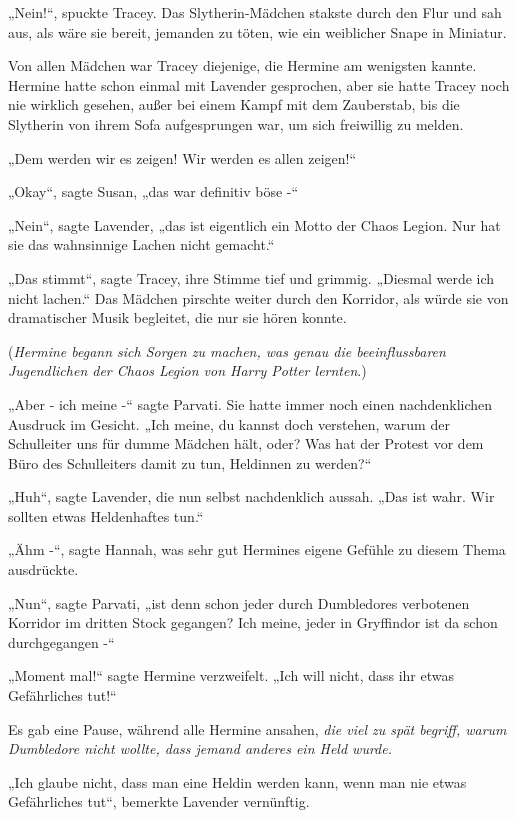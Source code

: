 {„Nein!“, spuckte Tracey. Das Slytherin-Mädchen stakste durch den Flur und sah aus, als wäre sie bereit, jemanden zu töten, wie ein weiblicher Snape in Miniatur.

Von allen Mädchen war Tracey diejenige, die Hermine am wenigsten kannte. Hermine hatte schon einmal mit Lavender gesprochen, aber sie hatte Tracey noch nie wirklich gesehen, außer bei einem Kampf mit dem Zauberstab, bis die Slytherin von ihrem Sofa aufgesprungen war, um sich freiwillig zu melden.

„Dem werden wir es zeigen! Wir werden es allen zeigen!“

„Okay“, sagte Susan, „das war definitiv böse -“

„Nein“, sagte Lavender, „das ist eigentlich ein Motto der Chaos Legion. Nur hat sie das wahnsinnige Lachen nicht gemacht.“

„Das stimmt“, sagte Tracey, ihre Stimme tief und grimmig. „Diesmal werde ich nicht lachen.“ Das Mädchen pirschte weiter durch den Korridor, als würde sie von dramatischer Musik begleitet, die nur sie hören konnte.

(\emph{Hermine begann sich Sorgen zu machen, was genau die beeinflussbaren Jugendlichen der Chaos Legion von Harry Potter lernten}.)

„Aber - ich meine -“ sagte Parvati. Sie hatte immer noch einen nachdenklichen Ausdruck im Gesicht. „Ich meine, du kannst doch verstehen, warum der Schulleiter uns für dumme Mädchen hält, oder? Was hat der Protest vor dem Büro des Schulleiters damit zu tun, Heldinnen zu werden?“

„Huh“, sagte Lavender, die nun selbst nachdenklich aussah. „Das ist wahr. Wir sollten etwas Heldenhaftes tun.“

„Ähm -“, sagte Hannah, was sehr gut Hermines eigene Gefühle zu diesem Thema ausdrückte.

„Nun“, sagte Parvati, „ist denn schon jeder durch Dumbledores verbotenen Korridor im dritten Stock gegangen? Ich meine, jeder in Gryffindor ist da schon durchgegangen -“

„Moment mal!“ sagte Hermine verzweifelt. „Ich will nicht, dass ihr etwas Gefährliches tut!“

Es gab eine Pause, während alle Hermine ansahen, \emph{die viel zu spät begriff, warum Dumbledore nicht wollte, dass jemand anderes ein Held wurde.}

„Ich glaube nicht, dass man eine Heldin werden kann, wenn man nie etwas Gefährliches tut“, bemerkte Lavender vernünftig.

}

